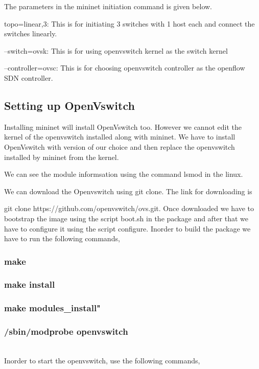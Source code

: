 The parameters in the mininet initiation command is given below. 

topo=linear,3: This is for initiating 3 switches with 1 host each and connect the switches linearly. 

–switch=ovsk: This is for using openvswitch kernel as the switch kernel 

–controller=ovsc: This is for choosing openvswitch controller as the openflow SDN controller. 
\subsection{Setting up OpenVswitch}

Installing mininet will install OpenVswitch too. However we cannot edit the kernel of the openvswitch installed along with mininet. We have to install OpenVswitch with version of our choice and then replace the openvswitch installed by mininet from the kernel. 

We can see the module informsation using the command lsmod in the linux.  

We can download the Openvswitch using git clone. The link for downloading is  

git clone https://github.com/openvswitch/ovs.git. Once downloaded we have to bootstrap the image using the script boot.sh in the package and after that we have to configure it using the script configure. Inorder to build the package we have to run the following commands, 



\subsubsection{make} 
\subsubsection{make install}
\subsubsection{make modules_install"}
\subsubsection{/sbin/modprobe openvswitch}\\



Inorder to start the openvswitch, use the following commands,\\

